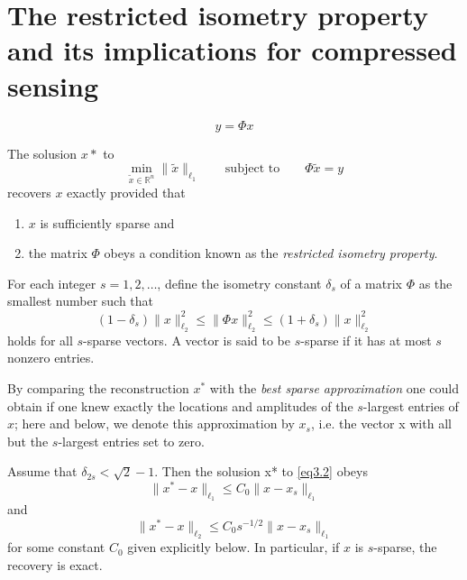 \chapter{The restricted isometry property and its implications for compressed sensing}
\begin{equation}
    y=\Phi x
    \label{eq3.1}
\end{equation}


The solusion $x*$ to 
\begin{equation}
    \min\limits_{\tilde{x} \in \mathbb{R}^n} \|\tilde{x}\|_{\ell_1} \qquad \text{subject to} \qquad \Phi \tilde{x}=y
    \label{eq3.2}
\end{equation}
recovers $x$ exactly provided that
\begin{enumerate}[1)]
    \item $x$ is sufficiently sparse and
    \item the matrix $\Phi$ obeys a condition known as the \emph{restricted isometry property}. 
\end{enumerate}


\begin{definition}
    \label{def3.1.1}
    For each integer $s=1,2,\dots$, define the isometry constant $\delta_s$ of a matrix $\Phi$ as the smallest number such that 
    \begin{equation}
        (1-\delta_s)\|x\|^2_{\ell_2} \leqslant \|\Phi x\|^2_{\ell_2} \leqslant (1+\delta_s)\|x\|^2_{\ell_2}
        \label{eq3.3}
    \end{equation}
    holds for all $s$-sparse vectors. A vector is said to be $s$-sparse if it has at most $s$ nonzero entries.
\end{definition}

By comparing the reconstruction $x^*$ with the \emph{best sparse approximation} one could obtain if one knew exactly the locations and amplitudes of the $s$-largest entries of $x$; here and below, we denote this approximation by $x_s$, i.e. the vector x with all but the $s$-largest entries set to zero.

\begin{theorem}
    Assume that $\delta_{2s} < \sqrt{2}-1$. Then the solusion x* to \cref{eq3.2} obeys
    \begin{equation}
        \|x^*-x\|_{\ell_1} \leqslant C_0 \|x-x_s\|_{\ell_1}
        \label{eq3.4}
    \end{equation}
    and
    \begin{equation}
        \|x^*-x\|_{\ell_2} \leqslant C_0 s^{-1/2}\|x-x_s\|_{\ell_1}
        \label{eq3.5}
    \end{equation}
    for some constant $C_0$ given explicitly below. In particular, if $x$ is $s$-sparse, the recovery is exact.
    \label{th3.1.2}
\end{theorem}

